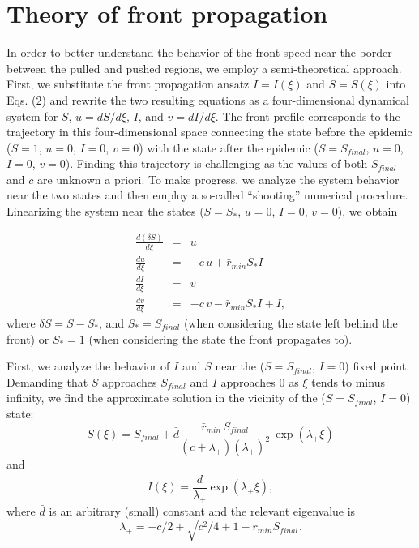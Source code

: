 \documentclass[pre,aps,twocolumn,showpacs]{revtex4}
\begin{document}
\section{Theory of front propagation}

In order to better understand the behavior of the front speed near the border between the pulled and pushed regions, we employ a semi-theoretical approach. First, we substitute the front propagation ansatz $I = I(\xi)$ and $S = S(\xi)$ into Eqs. (2) and rewrite the two resulting equations as a four-dimensional dynamical system for $S$, $u=dS/d\xi$, $I$, and $v=dI/d\xi$. The front profile corresponds to the trajectory in this four-dimensional space connecting the state before the epidemic ($S=1$, $u=0$, $I=0$, $v=0$) with the state after the epidemic ($S=S_{final}$, $u=0$, $I=0$, $v=0$). Finding this trajectory is challenging as the values of both $S_{final}$ and $c$ are unknown a priori. To make progress, we analyze the system behavior near the two states and then employ a so-called “shooting” numerical procedure. Linearizing the system near the states ($S=S_*$, $u=0$, $I=0$, $v=0$), we obtain

\begin{eqnarray}
\frac{d (\delta S)}{d \xi} &=& u \\ \nonumber
\frac{d u}{d \xi} &=& -c\,u +   \bar{r}_{min} S_* I \\ \nonumber
\frac{d I}{d \xi} &=& v \\ \nonumber
\frac{d v}{d \xi} &=& -c\,v - \bar{r}_{min} S_* I +  I,
\end{eqnarray}
where $\delta S = S - S_*$, and $S_*=S_{final}$ (when considering the state left behind the front) or $S_*=1$ (when considering the state the front propagates to).

First, we analyze the behavior of $I$ and $S$ near the ($S=S_{final}$, $I=0$) fixed point. Demanding that $S$ approaches $S_{final}$ and $I$ approaches $0$ as $\xi$ tends to minus infinity, we find the approximate solution in the vicinity of the ($S=S_{final}$, $I=0$) state:
$$S(\xi) = S_{final} + \bar{d}\frac{\bar{r}_{min}\,S_{final}}{(c+\lambda_+)(\lambda_+)^2}\,\exp(\lambda_+ \xi)$$ and
$$I(\xi) = \frac{\bar{d}}{\lambda_+}\exp(\lambda_+ \xi),$$
where $\bar{d}$ is an arbitrary (small) constant and the relevant eigenvalue is
$$\lambda_+ = -c/2 + \sqrt{c^2/4 + 1 -\bar{r}_{min}S_{final}}.$$
\end{document}
